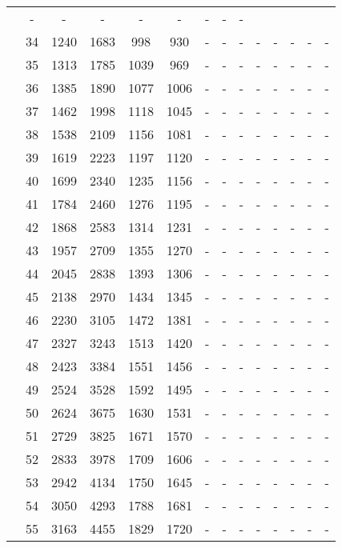 \begin{table}[htb]
{\begin{tabular}{|c|c|c|c|c|c|c|c|c|c|c|c|c|c|}
 & - & -
 & - & -
 & - & -
 & - & -
 \\
 & 
34 & 1240 & 1683 & 998 & 930
 & - & -
 & - & -
 & - & -
 & - & -
 \\
 & 
35 & 1313 & 1785 & 1039 & 969
 & - & -
 & - & -
 & - & -
 & - & -
 \\
 & 
36 & 1385 & 1890 & 1077 & 1006
 & - & -
 & - & -
 & - & -
 & - & -
 \\
 & 
37 & 1462 & 1998 & 1118 & 1045
 & - & -
 & - & -
 & - & -
 & - & -
 \\
 & 
38 & 1538 & 2109 & 1156 & 1081
 & - & -
 & - & -
 & - & -
 & - & -
 \\
 & 
39 & 1619 & 2223 & 1197 & 1120
 & - & -
 & - & -
 & - & -
 & - & -
 \\
 & 
40 & 1699 & 2340 & 1235 & 1156
 & - & -
 & - & -
 & - & -
 & - & -
 \\
 & 
41 & 1784 & 2460 & 1276 & 1195
 & - & -
 & - & -
 & - & -
 & - & -
 \\
 & 
42 & 1868 & 2583 & 1314 & 1231
 & - & -
 & - & -
 & - & -
 & - & -
 \\
 & 
43 & 1957 & 2709 & 1355 & 1270
 & - & -
 & - & -
 & - & -
 & - & -
 \\
 & 
44 & 2045 & 2838 & 1393 & 1306
 & - & -
 & - & -
 & - & -
 & - & -
 \\
 & 
45 & 2138 & 2970 & 1434 & 1345
 & - & -
 & - & -
 & - & -
 & - & -
 \\
 & 
46 & 2230 & 3105 & 1472 & 1381
 & - & -
 & - & -
 & - & -
 & - & -
 \\
 & 
47 & 2327 & 3243 & 1513 & 1420
 & - & -
 & - & -
 & - & -
 & - & -
 \\
 & 
48 & 2423 & 3384 & 1551 & 1456
 & - & -
 & - & -
 & - & -
 & - & -
 \\
 & 
49 & 2524 & 3528 & 1592 & 1495
 & - & -
 & - & -
 & - & -
 & - & -
 \\
 & 
50 & 2624 & 3675 & 1630 & 1531
 & - & -
 & - & -
 & - & -
 & - & -
 \\
 & 
51 & 2729 & 3825 & 1671 & 1570
 & - & -
 & - & -
 & - & -
 & - & -
 \\
 & 
52 & 2833 & 3978 & 1709 & 1606
 & - & -
 & - & -
 & - & -
 & - & -
 \\
 & 
53 & 2942 & 4134 & 1750 & 1645
 & - & -
 & - & -
 & - & -
 & - & -
 \\
 & 
54 & 3050 & 4293 & 1788 & 1681
 & - & -
 & - & -
 & - & -
 & - & -
 \\
 & 
55 & 3163 & 4455 & 1829 & 1720
 & - & -
 & - & -
 & - & -
 & - & -
 \\

\end{tabular}}
\end{table}
